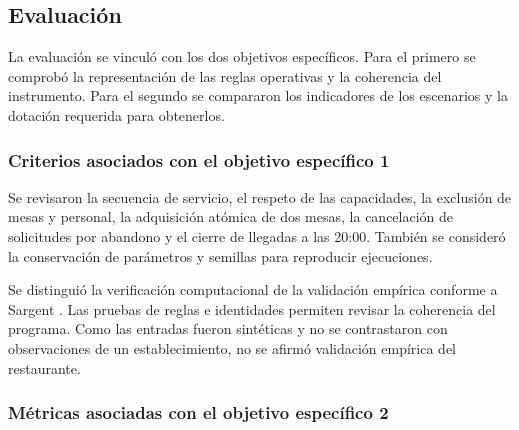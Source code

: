 \documentclass[10pt,a4paper,twocolumn]{article}
\begin{document}
\subsection{Evaluación}

La evaluación se vinculó con los dos objetivos específicos. Para el primero se comprobó la representación de las reglas operativas y la coherencia del instrumento. Para el segundo se compararon los indicadores de los escenarios y la dotación requerida para obtenerlos.

\subsubsection*{Criterios asociados con el objetivo específico 1}

Se revisaron la secuencia de servicio, el respeto de las capacidades, la exclusión de mesas y personal, la adquisición atómica de dos mesas, la cancelación de solicitudes por abandono y el cierre de llegadas a las 20:00. También se consideró la conservación de parámetros y semillas para reproducir ejecuciones.

Se distinguió la verificación computacional de la validación empírica conforme a Sargent \cite{ref3}. Las pruebas de reglas e identidades permiten revisar la coherencia del programa. Como las entradas fueron sintéticas y no se contrastaron con observaciones de un establecimiento, no se afirmó validación empírica del restaurante.

\subsubsection*{Métricas asociadas con el objetivo específico 2}
\end{document}
